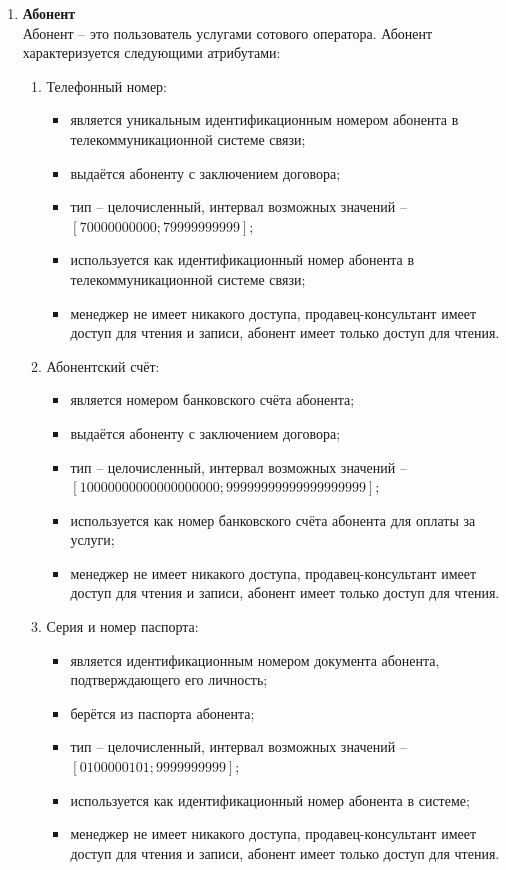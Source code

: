 \begin{enumerate}
    \item \textbf{Абонент} \\
    Абонент -- это пользователь услугами сотового оператора. Абонент характеризуется следующими атрибутами:
    \begin{enumerate}
        \item Телефонный номер:
        \begin{itemize}
            \item является уникальным идентификационным номером абонента в телекоммуникационной системе связи;
            \item выдаётся абоненту с заключением договора;
            \item тип -- целочисленный, интервал возможных значений -- $[70000000000; 79999999999]$;
            \item используется как идентификационный номер абонента в телекоммуникационной системе связи;
            \item менеджер не имеет никакого доступа, продавец-консультант имеет доступ для чтения и записи, абонент имеет только доступ для чтения.
        \end{itemize}

        \item Абонентский счёт:
        \begin{itemize}
            \item является номером банковского счёта абонента;
            \item выдаётся абоненту с заключением договора;
            \item тип -- целочисленный, интервал возможных значений -- $[10000000000000000000; 99999999999999999999]$;
            \item используется как номер банковского счёта абонента для оплаты за услуги;
            \item менеджер не имеет никакого доступа, продавец-консультант имеет доступ для чтения и записи, абонент имеет только доступ для чтения.
        \end{itemize}

        \item Серия и номер паспорта:
        \begin{itemize}
            \item является идентификационным номером документа абонента, подтверждающего его личность;
            \item берётся из паспорта абонента;
            \item тип -- целочисленный, интервал возможных значений -- $[0100000101; 9999999999]$;
            \item используется как идентификационный номер абонента в системе;
            \item менеджер не имеет никакого доступа, продавец-консультант имеет доступ для чтения и записи, абонент имеет только доступ для чтения.
        \end{itemize}


\end{enumerate}
\end{enumerate}
